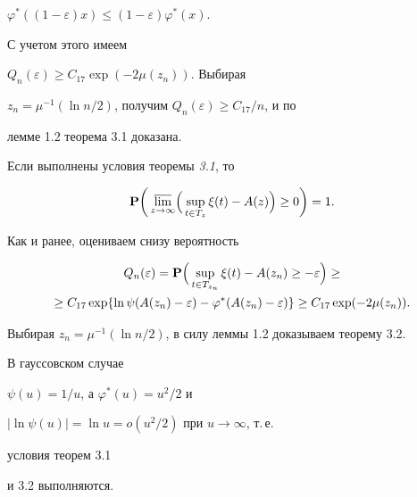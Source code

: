 $\varphi^*((1-\varepsilon)x)\le(1-\varepsilon)\varphi^*(x)$. 


С учетом этого имеем


$Q_n(\varepsilon)\ge C_{17}\exp(-2\mu(z_n))$. Выбирая 


$z_n=\mu^{-1}(\ln n/2)$, получим $Q_n(\varepsilon)\ge C_{17}/n$, и по 


лемме 1.2 теорема 3.1 доказана. 


 


\begin{thms} Если выполнены условия теоремы {\em 3.1}, то 


$$ 


{\bold P}\biggl(\,\underset{z\to\infty}{\varlimsup}\Bigl(\, 


\sup_{t\in T_z}\xi(t)-A(z)\Bigr)\ge 0\biggr)=1. 


$$ 


\end{thms} 


 


\begin{pf} Как и ранее, оцениваем снизу вероятность 


\begin{gather*} 


Q_n(\varepsilon)={\bold P}\Bigl(\, 


\sup_{t\in T_{z_n}}\xi(t)-A(z_n)\ge-\varepsilon\Bigr)\ge \\ 


\ge C_{17}\exp\{\ln\psi(A(z_n)-\varepsilon)-\varphi^* 


(A(z_n)-\varepsilon)\}\ge 


C_{17}\exp(-2\mu(z_n)). 


\end{gather*} 


Выбирая $z_n=\mu^{-1}(\ln n/2)$, в силу леммы 1.2 доказываем теорему 3.2. 


\end{pf} 


 


\begin{notes} В гауссовском случае 


$\psi(u)=1/u$, а $\varphi^*(u)=u^2/2$ и 


$|\ln\psi(u)|=\ln u=o(u^2/2)$ при $u\to\infty$, т.\,е. 


условия теорем 3.1 


и 3.2 выполняются. 


\end{notes} 


